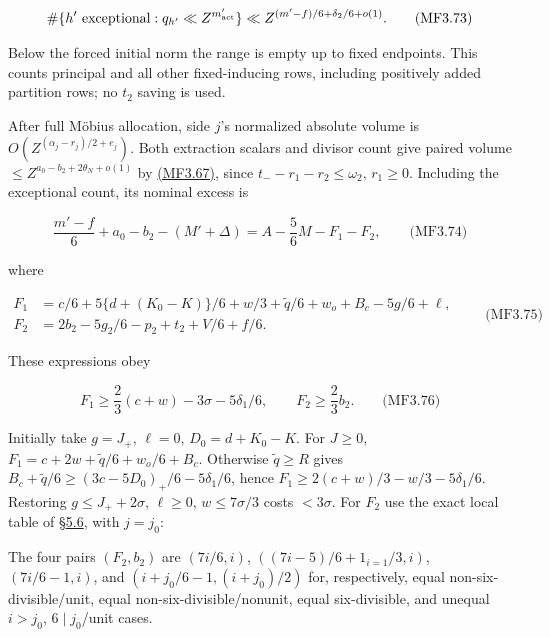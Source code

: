 \hypertarget{mf:eq:B3.73}{}

\label{mf:eq:B3.73}

\[
\#\{h'\text{ exceptional}:q_{h'}\ll Z^{m'_{\rm act}}\}
\ll Z^{(m'-f)/6+\delta_2/6+o(1)}.
\qquad\text{(MF3.73)}
\]

Below the forced initial norm the range is empty up to fixed endpoints. This counts principal and all other fixed-inducing rows, including positively added partition rows; no \(t_2\) saving is used.

After full Möbius allocation, side \(j\)'s normalized absolute volume is \(O(Z^{(\alpha_j-r_j)/2+e_j})\). Both extraction scalars and divisor count give paired volume \(\le Z^{a_0-b_2+2\theta_N+o(1)}\) by \protect\hyperlink{mf:eq:B3.67}{(MF3.67)}, since \(t_--r_1-r_2\le\omega_2\), \(r_1\ge0\). Including the exceptional count, its nominal excess is

\hypertarget{mf:eq:B3.74}{}

\label{mf:eq:B3.74}

\[
\frac{m'-f}{6}+a_0-b_2-(M'+\Delta)
=A-\frac56M-F_1-F_2,
\qquad\text{(MF3.74)}
\]

where

\hypertarget{mf:eq:B3.75}{}

\label{mf:eq:B3.75}

\[
\begin{aligned}
F_1&=c/6+5\{d+(K_0-K)\}/6+w/3+\widetilde q/6+w_o+B_c-5g/6+\ell,\\
F_2&=2b_2-5g_2/6-p_2+t_2+V/6+f/6.
\end{aligned}\qquad\text{(MF3.75)}
\]

These expressions obey

\hypertarget{mf:eq:B3.76}{}

\label{mf:eq:B3.76}

\[
F_1\ge\frac23(c+w)-3\sigma-5\delta_1/6,
\qquad F_2\ge\frac23b_2.
\qquad\text{(MF3.76)}
\]

Initially take \(g=J_+\), \(\ell=0\), \(D_0=d+K_0-K\). For \(J\ge0\), \(F_1=c+2w+\widetilde q/6+w_o/6+B_c\). Otherwise \(\widetilde q\ge R\) gives \(B_c+\widetilde q/6\ge(3c-5D_0)_+/6-5\delta_1/6\), hence \(F_1\ge2(c+w)/3-w/3-5\delta_1/6\). Restoring \(g\le J_++2\sigma\), \(\ell\ge0\), \(w\le7\sigma/3\) costs \(<3\sigma\). For \(F_2\) use the exact local table of §\protect\hyperlink{cf:sec:D.6}{5.6}, with \(j=j_0\):

The four pairs \((F_2,b_2)\) are \((7i/6,i)\), \(((7i-5)/6+1_{i=1}/3,i)\), \((7i/6-1,i)\), and \((i+j_0/6-1,(i+j_0)/2)\) for, respectively, equal non-six-divisible/unit, equal non-six-divisible/nonunit, equal six-divisible, and unequal \(i>j_0\), \(6\mid j_0\)/unit cases.

